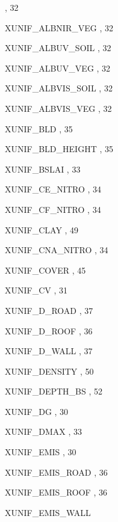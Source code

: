 \begin{theindex}
    \subitem {},  32
  \item XUNIF\_ALBNIR\_VEG
    \subitem {},  32
  \item XUNIF\_ALBUV\_SOIL
    \subitem {},  32
  \item XUNIF\_ALBUV\_VEG
    \subitem {},  32
  \item XUNIF\_ALBVIS\_SOIL
    \subitem {},  32
  \item XUNIF\_ALBVIS\_VEG
    \subitem {},  32
  \item XUNIF\_BLD
    \subitem {},  35
  \item XUNIF\_BLD\_HEIGHT
    \subitem {},  35
  \item XUNIF\_BSLAI
    \subitem {},  33
  \item XUNIF\_CE\_NITRO
    \subitem {},  34
  \item XUNIF\_CF\_NITRO
    \subitem {},  34
  \item XUNIF\_CLAY
    \subitem {},  49
  \item XUNIF\_CNA\_NITRO
    \subitem {},  34
  \item XUNIF\_COVER
    \subitem {},  45
  \item XUNIF\_CV
    \subitem {},  31
  \item XUNIF\_D\_ROAD
    \subitem {},  37
  \item XUNIF\_D\_ROOF
    \subitem {},  36
  \item XUNIF\_D\_WALL
    \subitem {},  37
  \item XUNIF\_DENSITY
    \subitem {},  50
  \item XUNIF\_DEPTH\_BS
    \subitem {},  52
  \item XUNIF\_DG
    \subitem {},  30
  \item XUNIF\_DMAX
    \subitem {},  33
  \item XUNIF\_EMIS
    \subitem {},  30
  \item XUNIF\_EMIS\_ROAD
    \subitem {},  36
  \item XUNIF\_EMIS\_ROOF
    \subitem {},  36
  \item XUNIF\_EMIS\_WALL

\end{theindex}
